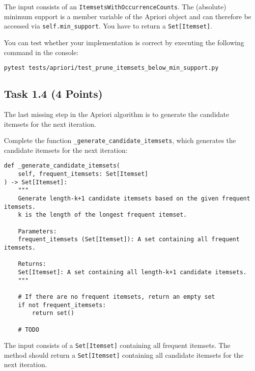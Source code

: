 \documentclass[
english,
smallborders
]{i6prcsht}
\newcommand{\points}[1]{\hfill \color{red}(#1 Points)\color{black}}
\begin{document}
\vspace*{0.1cm}

The input consists of an \texttt{ItemsetsWithOccurrenceCounts}. The (absolute) minimum support is a member variable of the Apriori object and can therefore be accessed via \texttt{self.min\_support}. You have to return a \texttt{Set[Itemset]}.

You can test whether your implementation is correct by executing the following command in the console:

\vspace*{0.3cm}

\begin{lstlisting}
pytest tests/apriori/test_prune_itemsets_below_min_support.py
\end{lstlisting}

\vspace*{0.1cm}

\subsection*{Task 1.4 \points{4}}

The last missing step in the Apriori algorithm is to generate the candidate itemsets for the next iteration.

Complete the function \texttt{\_generate\_candidate\_itemsets}, which generates the candidate itemsets for the next iteration:

\vspace*{0.3cm}

\begin{lstlisting}
def _generate_candidate_itemsets(
    self, frequent_itemsets: Set[Itemset]
) -> Set[Itemset]:
	"""
	Generate length-k+1 candidate itemsets based on the given frequent itemsets.
	k is the length of the longest frequent itemset.

	Parameters:
	frequent_itemsets (Set[Itemset]): A set containing all frequent itemsets.

	Returns:
	Set[Itemset]: A set containing all length-k+1 candidate itemsets.
	"""

	# If there are no frequent itemsets, return an empty set
	if not frequent_itemsets:
		return set()

	# TODO
\end{lstlisting}

\vspace*{0.1cm}

The input consists of a \texttt{Set[Itemset]} containing all frequent itemsets. The method should return a \texttt{Set[Itemset]} containing all candidate itemsets for the next iteration.
\end{document}
